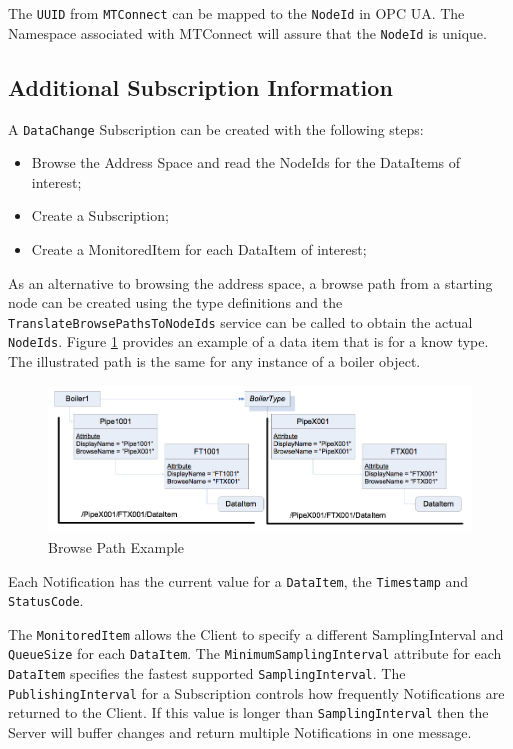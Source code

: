 The \texttt{UUID} from \texttt{MTConnect} can be mapped to the \texttt{NodeId} in OPC UA. The Namespace associated with MTConnect will assure that the \texttt{NodeId} is unique.

\FloatBarrier
\subsection{Additional Subscription Information}

A \texttt{DataChange} Subscription can be created with the following steps:

\begin{itemize}
\item Browse the Address Space and read the NodeIds for the DataItems of interest;
\item Create a Subscription;
\item Create a MonitoredItem for each DataItem of interest;
\end{itemize}

As an alternative to browsing the address space, a browse path from a starting node can be created using the type definitions and the \texttt{TranslateBrowsePathsToNodeIds} service can be called to obtain the actual \texttt{NodeIds}. Figure \ref{fig:browse_path_ex} provides an example of a data item that is for a know type. The illustrated path is the same for any instance of a boiler object.

\begin{figure}[h]
  \centering
  \includegraphics[width=1.0\textwidth]{diagrams/BrowsePathEx.png}
  \caption{Browse Path Example}
  \label{fig:browse_path_ex}
\end{figure}

Each Notification has the current value for a \texttt{DataItem}, the \texttt{Timestamp} and \texttt{Status\-Code}.

The \texttt{MonitoredItem} allows the Client to specify a different SamplingInterval and \texttt{QueueSize} for each \texttt{DataItem}. The \texttt{MinimumSamplingInterval} attribute for each \texttt{DataItem} specifies the fastest supported \texttt{SamplingInterval}. The \texttt{Publishing\-Interval} for a Subscription controls how frequently Notifications are returned to the Client. If this value is longer than \texttt{Sampling\-Interval} then the Server will buffer changes and return multiple Notifications in one message. 

